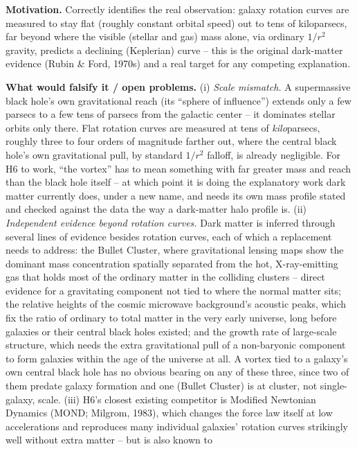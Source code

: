 \documentclass[12pt, a4paper]{article}
\begin{document}
\textbf{Motivation.} Correctly identifies the real observation: galaxy
rotation curves are measured to stay flat (roughly constant orbital
speed) out to tens of kiloparsecs, far beyond where the visible
(stellar and gas) mass alone, via ordinary $1/r^2$ gravity, predicts a
declining (Keplerian) curve -- this is the original dark-matter
evidence (Rubin \& Ford, 1970s) and a real target for any competing
explanation.

\textbf{What would falsify it / open problems.}
(i) \emph{Scale mismatch.} A supermassive black hole's own
gravitational reach (its ``sphere of influence'') extends only a few
parsecs to a few tens of parsecs from the galactic center -- it
dominates stellar orbits only there. Flat rotation curves are
measured at tens of \emph{kilo}parsecs, roughly three to four orders
of magnitude farther out, where the central black hole's own
gravitational pull, by standard $1/r^2$ falloff, is already
negligible. For H6 to work, ``the vortex'' has to mean something with
far greater mass and reach than the black hole itself -- at which
point it is doing the explanatory work dark matter currently does,
under a new name, and needs its own mass profile stated and checked
against the data the way a dark-matter halo profile is. (ii) \emph{
Independent evidence beyond rotation curves.} Dark matter is inferred
through several lines of evidence besides rotation curves, each of
which a replacement needs to address: the Bullet Cluster, where
gravitational lensing maps show the dominant mass concentration
spatially separated from the hot, X-ray-emitting gas that holds most
of the ordinary matter in the colliding clusters -- direct evidence
for a gravitating component not tied to where the normal matter sits;
the relative heights of the cosmic microwave background's acoustic
peaks, which fix the ratio of ordinary to total matter in the very
early universe, long before galaxies or their central black holes
existed; and the growth rate of large-scale structure, which needs
the extra gravitational pull of a non-baryonic component to form
galaxies within the age of the universe at all. A vortex tied to a
galaxy's own central black hole has no obvious bearing on any of
these three, since two of them predate galaxy formation and one
(Bullet Cluster) is at cluster, not single-galaxy, scale. (iii) H6's
closest existing competitor is Modified Newtonian Dynamics (MOND;
Milgrom, 1983), which changes the force law itself at low
accelerations and reproduces many individual galaxies' rotation
curves strikingly well without extra matter -- but is also known to
\end{document}
